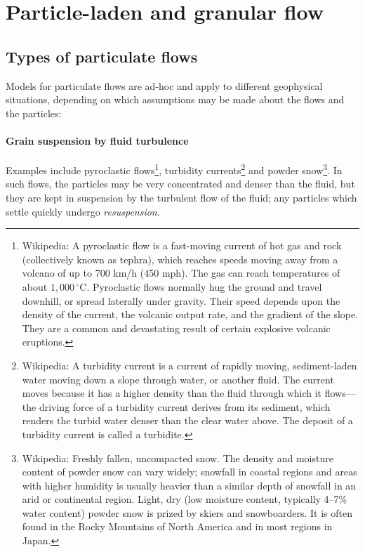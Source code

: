 \section{Particle-laden and granular flow}

\subsection{Types of particulate flows}

Models for particulate flows are ad-hoc and apply to different geophysical situations, depending on which assumptions may be made about the flows and the particles:

\paragraph{Grain suspension by fluid turbulence} Examples include pyroclastic
flows\footnote{Wikipedia: A pyroclastic flow is a fast-moving current of hot gas and
rock (collectively known as tephra), which reaches speeds moving away from a
volcano of up to 700 km/h (450 mph). The gas can reach temperatures of about
$1,000\,^{\circ}\mathrm{C}$. Pyroclastic flows normally hug the ground and travel downhill, or
spread laterally under gravity. Their speed depends upon the density of the
current, the volcanic output rate, and the gradient of the slope. They are a
common and devastating result of certain explosive volcanic eruptions.}, turbidity currents\footnote{Wikipedia: A turbidity current is a current of rapidly moving,
sediment-laden water moving down a slope through water, or another fluid. The
current moves because it has a higher density than the fluid through which it
flows—the driving force of a turbidity current derives from its sediment, which
renders the turbid water denser than the clear water above. The deposit of a
turbidity current is called a turbidite.} and powder snow\footnote{Wikipedia: Freshly fallen, uncompacted snow. The density and moisture
content of powder snow can vary widely; snowfall in coastal regions and areas
with higher humidity is usually heavier than a similar depth of snowfall in an
arid or continental region. Light, dry (low moisture content, typically 4–7\%
water content) powder snow is prized by skiers and snowboarders. It is often
found in the Rocky Mountains of North America and in most regions in Japan.}. In such flows, the particles may be very concentrated and denser than the fluid, but
they are kept in suspension by the turbulent flow of the fluid; any particles
which settle quickly undergo \textit{resuspension}.


